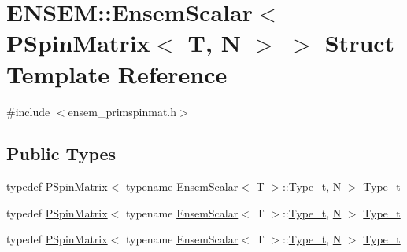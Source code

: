 \hypertarget{structENSEM_1_1EnsemScalar_3_01PSpinMatrix_3_01T_00_01N_01_4_01_4}{}\section{E\+N\+S\+EM\+:\+:Ensem\+Scalar$<$ P\+Spin\+Matrix$<$ T, N $>$ $>$ Struct Template Reference}
\label{structENSEM_1_1EnsemScalar_3_01PSpinMatrix_3_01T_00_01N_01_4_01_4}


{\ttfamily \#include $<$ensem\+\_\+primspinmat.\+h$>$}

\subsection*{Public Types}
\begin{DoxyCompactItemize}
\item 
typedef \mbox{\hyperlink{classENSEM_1_1PSpinMatrix}{P\+Spin\+Matrix}}$<$ typename \mbox{\hyperlink{structENSEM_1_1EnsemScalar}{Ensem\+Scalar}}$<$ T $>$\+::\mbox{\hyperlink{structENSEM_1_1EnsemScalar_3_01PSpinMatrix_3_01T_00_01N_01_4_01_4_a45d77e25a68437833d711402b4dfd773}{Type\+\_\+t}}, \mbox{\hyperlink{adat__devel_2lib_2hadron_2operator__name__util_8cc_a7722c8ecbb62d99aee7ce68b1752f337}{N}} $>$ \mbox{\hyperlink{structENSEM_1_1EnsemScalar_3_01PSpinMatrix_3_01T_00_01N_01_4_01_4_a45d77e25a68437833d711402b4dfd773}{Type\+\_\+t}}
\item 
typedef \mbox{\hyperlink{classENSEM_1_1PSpinMatrix}{P\+Spin\+Matrix}}$<$ typename \mbox{\hyperlink{structENSEM_1_1EnsemScalar}{Ensem\+Scalar}}$<$ T $>$\+::\mbox{\hyperlink{structENSEM_1_1EnsemScalar_3_01PSpinMatrix_3_01T_00_01N_01_4_01_4_a45d77e25a68437833d711402b4dfd773}{Type\+\_\+t}}, \mbox{\hyperlink{adat__devel_2lib_2hadron_2operator__name__util_8cc_a7722c8ecbb62d99aee7ce68b1752f337}{N}} $>$ \mbox{\hyperlink{structENSEM_1_1EnsemScalar_3_01PSpinMatrix_3_01T_00_01N_01_4_01_4_a45d77e25a68437833d711402b4dfd773}{Type\+\_\+t}}
\item 
typedef \mbox{\hyperlink{classENSEM_1_1PSpinMatrix}{P\+Spin\+Matrix}}$<$ typename \mbox{\hyperlink{structENSEM_1_1EnsemScalar}{Ensem\+Scalar}}$<$ T $>$\+::\mbox{\hyperlink{structENSEM_1_1EnsemScalar_3_01PSpinMatrix_3_01T_00_01N_01_4_01_4_a45d77e25a68437833d711402b4dfd773}{Type\+\_\+t}}, \mbox{\hyperlink{adat__devel_2lib_2hadron_2operator__name__util_8cc_a7722c8ecbb62d99aee7ce68b1752f337}{N}} $>$ \mbox{\hyperlink{structENSEM_1_1EnsemScalar_3_01PSpinMatrix_3_01T_00_01N_01_4_01_4_a45d77e25a68437833d711402b4dfd773}{Type\+\_\+t}}
\end{DoxyCompactItemize}


